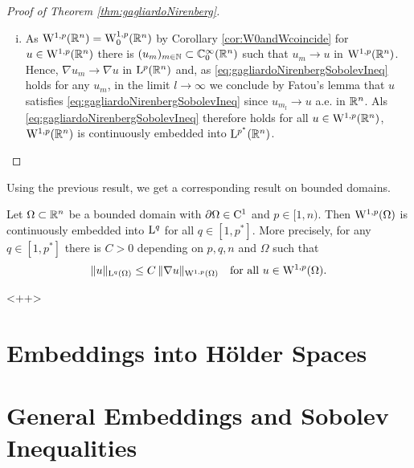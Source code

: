 \begin{proof}[Proof of Theorem \ref{thm:gagliardoNirenberg}]
\begin{enumerate}[i)]
    \item As $\mathrm{W}^{1,p}(\mathbb{R}^n) = \mathrm{W}_0^{1,p}(\mathbb{R}^n)$ by Corollary \ref{cor:W0andWcoincide} for $u \in \mathrm{W}^{1,p}(\mathbb{R}^n)$ there is $(u_m)_{m \in \mathbb{N}} \subset \mathbb{C}_0^\infty(\mathbb{R}^n)$ such that $u_m \to u$ in $\mathrm{W}^{1,p}(\mathbb{R}^n)$.
      Hence, $\nabla u_m \to \nabla u$ in $\mathrm{L}^p(\mathbb{R}^n)$ and, as \eqref{eq:gagliardoNirenbergSobolevIneq} holds for any $u_m$, in the limit $l \to \infty$ we conclude by Fatou's lemma that $u$ satisfies \eqref{eq:gagliardoNirenbergSobolevIneq} since $u_{m_l} \to u$ a.e. in $\mathbb{R}^n$.
      Als \eqref{eq:gagliardoNirenbergSobolevIneq} therefore holds for all $u \in \mathrm{W}^{1,p}(\mathbb{R}^n)$, $\mathrm{W}^{1,p}(\mathbb{R}^n)$ is continuously embedded into $\mathrm{L}^{p^*}(\mathbb{R}^n)$. \qedhere
  \end{enumerate}
\end{proof}

Using the previous result, we get a corresponding result on bounded domains.

\begin{thm}
  Let $\Omega \subset \mathbb{R}^n$ be a bounded domain with $\partial\Omega \in \mathrm{C}^1$ and $p \in [1,n)$.
    Then $\mathrm{W}^{1,p}(\Omega)$ is continuously embedded into $\mathrm{L}^q$ for all $q \in [1,p^*]$.
    More precisely, for any $q \in [1,p^*]$ there is $C > 0$ depending on $p,q,n$ and $\Omega$ such that
    \begin{equation}
      \|u\|_{\mathrm{L}^q(\Omega)} \leq C \, \|\nabla u\|_{\mathrm{W}^{1,p}(\Omega)} \quad\text{for all } u \in \mathrm{W}^{1,p}(\Omega).
    \end{equation}
\end{thm}<++>

\section{Embeddings into Hölder Spaces}

\section{General Embeddings and Sobolev Inequalities}

